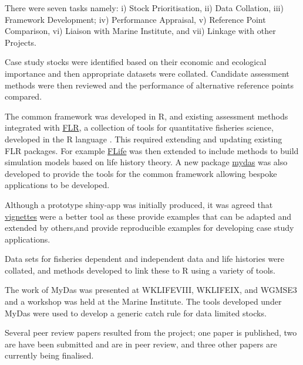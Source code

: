 There were seven tasks namely: i) Stock Prioritisation, ii) Data Collation, iii) Framework Development; iv) Performance Appraisal, v) Reference Point Comparison, vi) Liaison with Marine Institute, and vii) Linkage with other Projects. 

Case study stocks were identified based on their economic and ecological importance and then appropriate datasets were collated. Candidate assessment methods were then reviewed and the performance of alternative reference points compared. 

The common framework was developed in R, and existing assessment methods integrated with \href{http://www.flr-project.org/}{FLR}, a collection of tools for quantitative fisheries science, developed in the R language \citep{kell2007flr}. This required extending and updating existing FLR packages. For example \href{https://github.com/flr/flife}{FLife}
was then extended to include methods to build simulation models based on life history theory. A new package \href{https://github.com/flr/mydas/wiki}{mydas} was also developed to provide the tools for the common framework allowing bespoke applications to be developed.
 
Although a prototype shiny-app was initially produced, it was agreed that \href{https://3o2y9wugzp1kfxr5hvzgzq-on.drv.tw/MyDas/doc/html/mydas_vignettes.html}{vignettes} were a better tool as these provide examples that can be adapted and extended by others,and provide reproducible examples for developing case study applications.

Data sets for fisheries dependent and independent data and life histories were collated, and methods developed to link these to R using a variety of tools.

The work of MyDas was presented at WKLIFEVIII, WKLIFEIX, and WGMSE3 and a workshop was held at the Marine Institute. The tools developed under MyDas were used to develop a generic catch rule for data limited stocks.

Several peer review papers resulted from the project;  one paper is published, two are have been submitted and are in peer review, and three other papers are currently being finalised.

